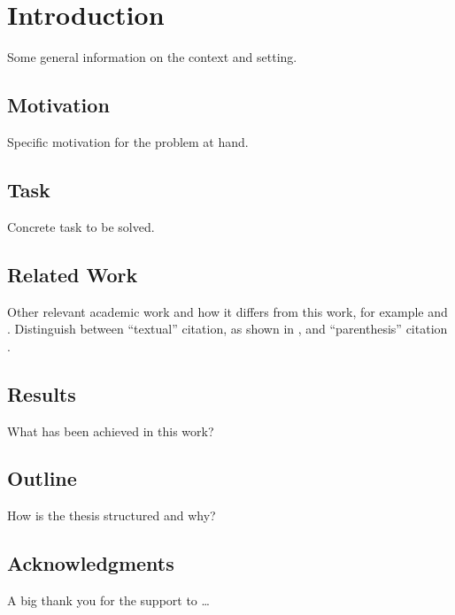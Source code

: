%
% 


\chapter{Introduction}

Some general information on the context and setting. 


\section{Motivation}

Specific motivation for the problem at hand. 


\section{Task}

Concrete task to be solved. 



\section{Related Work}

Other relevant academic work and how it differs from this work, for
example \citet{shannon_diff} and \citet{blowfish}. Distinguish between
``textual'' citation, as shown in \citet{shannon_diff}, and
``parenthesis'' citation \citep{blowfish}.



\section{Results}

What has been achieved in this work? 


\section{Outline}

How is the thesis structured and why? 


\section{Acknowledgments}

A big thank you for the support to \ldots 

